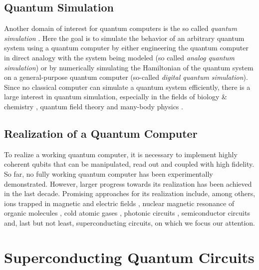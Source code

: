 \subsection{Quantum Simulation}

Another domain of interest for quantum computers is the so called {\it quantum simulation} \citep{lloyd_universal_1996}. Here the goal is to simulate the behavior of an arbitrary quantum system using a quantum computer by either engineering the quantum computer in direct analogy with the system being modeled (so called {\it analog quantum simulation}) or by numerically simulating the Hamiltonian of the quantum system on a general-purpose quantum computer (so-called {\it digital quantum simulation}). Since no classical computer can simulate a quantum system efficiently, there is a large interest in quantum simulation, especially in the fields of biology \& chemistry \citep{barreiro_open-system_2011}, quantum field theory \citep{gerritsma_quantum_2010,freedman_simulation_2002} and many-body physics \citep{simon_quantum_2011}.

\subsection{Realization of a Quantum Computer}

To realize a working quantum computer, it is necessary to implement highly coherent qubits that can be manipulated, read out and coupled with high fidelity. So far, no fully working quantum computer has been experimentally demonstrated. However, larger progress towards its realization has been achieved in the last decade. Promising approaches for its realization include, among others, ions trapped in magnetic and electric fields \citep{monroe_demonstration_1995,cirac_quantum_1995}, nuclear magnetic resonance of organic molecules \citep{jones_nmr_2001,vandersypen_experimental_2001}, cold atomic gases \citep{briegel_quantum_2000}, photonic circuits \citep{knill_scheme_2001}, semiconductor circuits \citep{loss_quantum_1998} and, last but not least, superconducting circuits, on which we focus our attention.

\section{Superconducting Quantum Circuits}


